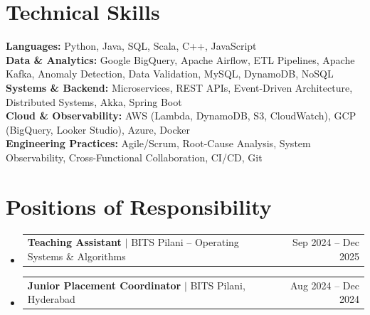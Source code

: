\documentclass[letterpaper,10.5pt]{article}
\makeatletter
\newcommand{\resumeProjectHeading}[2]{
\item
\begin{tabular*}{0.97\textwidth}{l@{\extracolsep{\fill}}r}
\small #1 & \small #2 \\
\end{tabular*}\vspace{-7pt}
}
\newcommand{\resumeSubHeadingListStart}{\begin{itemize}[leftmargin=0.12in, label={}]}
\newcommand{\resumeSubHeadingListEnd}{\end{itemize}}
\makeatother
\begin{document}
\section{Technical Skills}
\begin{itemize}[leftmargin=0.12in, label={}]
\small{\item{
\textbf{Languages:} Python, Java, SQL, Scala, C++, JavaScript \\[0.5pt]
\textbf{Data \& Analytics:} Google BigQuery, Apache Airflow, ETL Pipelines, Apache Kafka, Anomaly Detection, Data Validation, MySQL, DynamoDB, NoSQL \\[0.5pt]
\textbf{Systems \& Backend:} Microservices, REST APIs, Event-Driven Architecture, Distributed Systems, Akka, Spring Boot \\[0.5pt]
\textbf{Cloud \& Observability:} AWS (Lambda, DynamoDB, S3, CloudWatch), GCP (BigQuery, Looker Studio), Azure, Docker \\[0.5pt]
\textbf{Engineering Practices:} Agile/Scrum, Root-Cause Analysis, System Observability, Cross-Functional Collaboration, CI/CD, Git
}}
\end{itemize}\vspace{-4pt}

\section{Positions of Responsibility}
\resumeSubHeadingListStart
\resumeProjectHeading{\textbf{Teaching Assistant} $|$ \textnormal{BITS Pilani -- Operating Systems \& Algorithms}}{Sep 2024 -- Dec 2025}
\resumeProjectHeading{\textbf{Junior Placement Coordinator} $|$ \textnormal{BITS Pilani, Hyderabad}}{Aug 2024 -- Dec 2024}
\resumeSubHeadingListEnd
\end{document}
